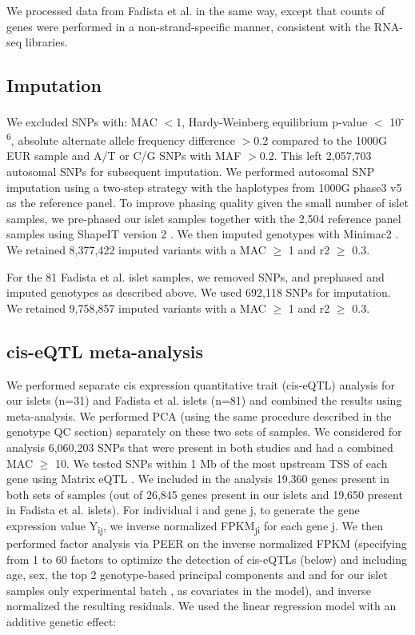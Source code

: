 We processed data from Fadista et al. in the same way, except that counts of genes were performed in a non-strand-specific manner, consistent with the RNA-seq libraries.

\subsection{Imputation} 
We excluded SNPs with: MAC $<$1, Hardy-Weinberg equilibrium p-value $<$ 10\textsuperscript{-6}, absolute alternate allele frequency difference $>$0.2 compared to the 1000G EUR sample and A/T or C/G SNPs with MAF $>$0.2.  This left 2,057,703 autosomal SNPs for subsequent imputation. We performed autosomal SNP imputation using a two-step strategy \cite{howieFastAccurateGenotype2012} with the haplotypes from 1000G phase3 v5 \cite{the1000genomesprojectconsortiumGlobalReferenceHuman2015a} as the reference panel. To improve phasing quality given the small number of islet samples, we pre-phased our islet samples together with the 2,504 reference panel samples using ShapeIT version 2 \cite{delaneauImprovedWholechromosomePhasing2013}. We then imputed genotypes with Minimac2 \cite{fuchsbergerMinimac2FasterGenotype2015}. We retained 8,377,422 imputed variants with a MAC $\geq$ 1 and r2 $\geq$ 0.3.

For the 81 Fadista et al. islet samples, we removed SNPs, and prephased and imputed genotypes as described above. We used 692,118 SNPs for imputation. We retained 9,758,857 imputed variants with a MAC $\geq$ 1 and r2 $\geq$ 0.3.

\subsection{cis-eQTL meta-analysis}
We performed separate cis expression quantitative trait (cis-eQTL) analysis for our islets (n=31) and Fadista et al. islets (n=81) and combined the results using meta-analysis. We performed PCA (using the same procedure described in the genotype QC section) separately on these two sets of samples.  We considered for analysis 6,060,203 SNPs that were present in both studies and had a combined MAC $\geq$ 10. We tested SNPs within 1 Mb of the most upstream TSS of each gene using Matrix eQTL \cite{shabalinMatrixEQTLUltra2012}. We included in the analysis 19,360 genes present in both sets of samples (out of 26,845 genes present in our islets and 19,650 present in Fadista et al. islets). For individual i and gene j, to generate the gene expression value Y\textsubscript{ij}, we inverse normalized FPKM\textsubscript{ji} for each gene j. We then performed factor analysis via PEER \cite{stegleBayesianFrameworkAccount2010, stegleUsingProbabilisticEstimation2012} on the inverse normalized FPKM (specifying from 1 to 60 factors to optimize the detection of cis-eQTLs (below) and including age, sex, the top 2 genotype-based principal components and and for our islet samples only experimental batch , as covariates in the model), and inverse normalized the resulting residuals. We used the linear regression model with an additive genetic effect: 

